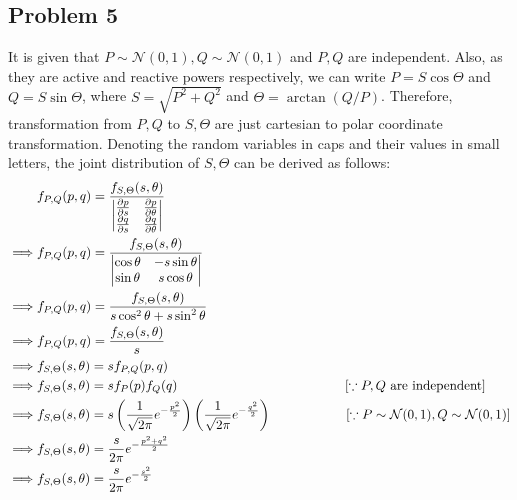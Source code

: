 \subsection*{Problem 5}
It is given that $P \sim \mathcal{N}(0,1), Q \sim \mathcal{N}(0,1)$ and $P,Q$ are independent. Also, as they are active and reactive powers respectively, we can write $P = S\cos \Theta$ and $Q=S \sin \Theta$, where $S=\sqrt{P^2+Q^2}$ and $\Theta = \arctan (Q/P)$. Therefore, transformation from $P,Q$ to $S,\Theta$ are just cartesian to polar coordinate transformation. Denoting the random variables in caps and their values in small letters, the joint distribution of $S,\Theta$ can be derived as follows:
\begin{align*}
	& f_{P,Q}(p,q) = \frac{f_{S,\Theta}(s, \theta)}{\begin{vmatrix} \frac{\partial p}{\partial s} & \frac{\partial p}{\partial \theta}\\
		\frac{\partial q}{\partial s} & \frac{\partial q}{\partial \theta}\end{vmatrix}}\\
	\implies & f_{P,Q}(p,q) = \frac{f_{S,\Theta}(s, \theta)}{\begin{vmatrix}
			\cos \theta & -s\sin \theta\\
			\sin \theta & s\cos \theta
		\end{vmatrix}}\\
	\implies & f_{P,Q}(p,q) = \frac{f_{S,\Theta}(s, \theta)}{s\cos^2 \theta + s\sin^2 \theta}\\
	\implies & f_{P,Q}(p,q) = \frac{f_{S,\Theta}(s, \theta)}{s}\\
	\implies & f_{S,\Theta}(s, \theta) = sf_{P,Q}(p,q)\\
	\implies & f_{S,\Theta}(s, \theta) = s f_P(p)f_Q(q) \hspace{4.5cm}[\because P,Q \text{ are independent}]\\
	\implies & f_{S,\Theta}(s, \theta) = s \left(\frac{1}{\sqrt{2\pi}}e^{-\frac{p^2}{2}}\right)\left(\frac{1}{\sqrt{2\pi}}e^{-\frac{q^2}{2}}\right) \hspace{2cm}[\because P\sim \mathcal{N}(0,1), Q\sim \mathcal{N}(0,1)]\\
	\implies & f_{S,\Theta}(s, \theta) = \frac{s}{2\pi}e^{-\frac{p^2+q^2}{2}}\\
	\implies & f_{S,\Theta}(s, \theta) = \frac{s}{2\pi}e^{-\frac{s^2}{2}}
\end{align*}
